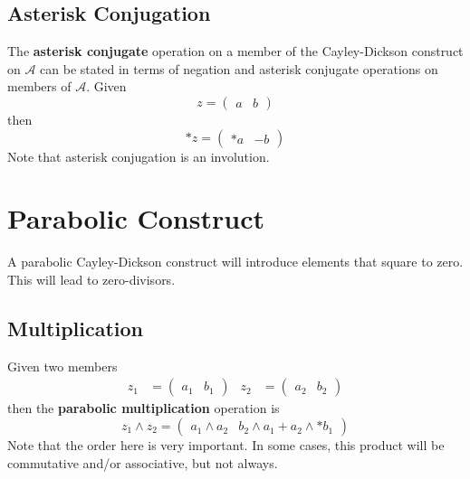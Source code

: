 \subsection{Asterisk Conjugation}
The \textbf{asterisk conjugate} operation on a member of the Cayley-Dickson construct on $\mathcal{A}$ can be stated in terms of negation and asterisk conjugate operations on members of $\mathcal{A}$. Given
\begin{equation}
    z = \begin{pmatrix}
        a & b
    \end{pmatrix}
\end{equation}
then
\begin{equation}
    {\ast z} = \begin{pmatrix}
        {\ast a} & -b
    \end{pmatrix}
\end{equation}
Note that asterisk conjugation is an involution.
\section{Parabolic Construct}
A parabolic Cayley-Dickson construct will introduce elements that square to zero. This will lead to zero-divisors.
\subsection{Multiplication}
Given two members
\begin{align*}
    z_{1} &= \begin{pmatrix}
        a_{1} & b_{1}
    \end{pmatrix} &
    z_{2} &= \begin{pmatrix}
        a_{2} & b_{2}
    \end{pmatrix}
\end{align*}
then the \textbf{parabolic multiplication} operation is
\begin{equation}
    z_{1} \wedge z_{2} = \begin{pmatrix}
        a_{1} \wedge a_{2} & b_{2} \wedge a_{1} + a_{2} \wedge {\ast b_{1}}
    \end{pmatrix}
\end{equation}
Note that the order here is very important. In some cases, this product will be commutative and/or associative, but not always.
